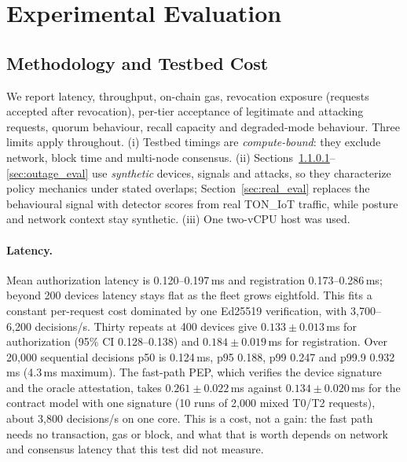 \section{Experimental Evaluation}\label{sec:eval}

\subsection{Methodology and Testbed Cost}\label{sec:metrics}
We report latency, throughput, on-chain gas, revocation exposure (requests accepted after revocation), per-tier acceptance of legitimate and attacking requests, quorum behaviour, recall capacity and degraded-mode behaviour. Three limits apply throughout. (i) Testbed timings are \emph{compute-bound}: they exclude network, block time and multi-node consensus. (ii) Sections~\ref{sec:scaling}--\ref{sec:outage_eval} use \emph{synthetic} devices, signals and attacks, so they characterize policy mechanics under stated overlaps; Section~\ref{sec:real_eval} replaces the behavioural signal with detector scores from real TON\_IoT traffic, while posture and network context stay synthetic. (iii) One two-vCPU host was used.

\paragraph{Latency.}\label{sec:scaling} Mean authorization latency is 0.120--0.197\,ms and registration 0.173--0.286\,ms; beyond 200 devices latency stays flat as the fleet grows eightfold. This fits a constant per-request cost dominated by one Ed25519 verification, with 3{,}700--6{,}200 decisions/s. Thirty repeats at 400 devices give $0.133\pm0.013$\,ms for authorization (95\% CI 0.128--0.138) and $0.184\pm0.019$\,ms for registration. Over 20{,}000 sequential decisions p50 is 0.124\,ms, p95 0.188, p99 0.247 and p99.9 0.932\,ms (4.3\,ms maximum). The fast-path PEP, which verifies the device signature and the oracle attestation, takes $0.261\pm0.022$\,ms against $0.134\pm0.020$\,ms for the contract model with one signature (10 runs of 2{,}000 mixed T0/T2 requests), about 3{,}800 decisions/s on one core. This is a cost, not a gain: the fast path needs no transaction, gas or block, and what that is worth depends on network and consensus latency that this test did not measure.

